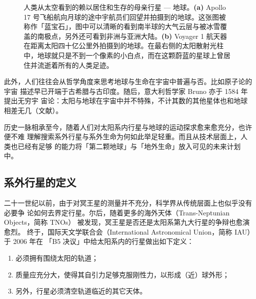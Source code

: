 {\begin{savenotes}
\begin{figure}[ht]
\begin{subfigure}[b]{.45\textwidth}
\label{fig:voyagerearth}
\addtocounter{footnote}{+1}
\end{subfigure}
\caption{人类从太空看到的赖以居住和生存的母亲行星 --- 地球。\textbf{(a)} Apollo 17 号飞船航向月球的途中宇航员们回望并拍摄到的地球。这张图被称作「蓝宝石」，图中可以清晰的看到南半球的大气云层与被冰雪覆盖的南极点，另外还可看到非洲与亚洲大陆。\textbf{(b)} Voyager 1 航天器在距离太阳四十亿公里外拍摄到的地球。在最右侧的太阳散射光柱中，地球就只是不到一个像素的小白点，而在这颗蔚蓝的星球上曾居住并流逝着所有的人类足迹。 }
\label{fig:rwalone} 
\end{figure}
\end{savenotes}
}

此外，人们往往会从哲学角度来思考地球与生命在宇宙中普遍与否。比如原子论的宇宙
描述早已开端于古希腊与古印度。随后，意大利哲学家 Bruno 亦于 1584 年提出无穷宇
宙论：太阳与地球在宇宙中并不特殊，不计其数的其他星体也和地球相差无几（文献）。


历史一脉相承至今，随着人们对太阳系内行星与地球的运动探求愈来愈充分，也许便不难
理解搜索系外行星与系外生命为何如此举足轻重。而且从技术层面上，人类也已经有足够
的能力将「第二颗地球」与「地外生命」放入可见的未来计划中\cite{WoolfAngel1998}。

\subsection{系外行星的定义}
    
二十一世纪以前，由于对冥王星的测量并不充分，科学界从传统层面上也似乎没有必要争
论如何去界定行星。尔后，随着更多的海外天体（Trans-Neptunian Objects，简称 TNOs）
被发现，冥王星是否还是太阳系第九大行星的争辩也愈演愈烈\cite{SternMitton2005}。
终于，国际天文学联合会（International Astronomical Union，简称 IAU）于 2006 年在
「B5 决议\footnotemark[3]」中给太阳系内的行星做出如下定义：
\setcounter{footnote}{3}

\begin{enumerate}[leftmargin=1\parindent]
\item 必须拥有围绕太阳的轨道；
\item 质量应充分大，使得其自引力足够克服刚性力，以形成（近）球外形；
\item 另外，行星必须清空轨道临近的其它天体。
\end{enumerate}

